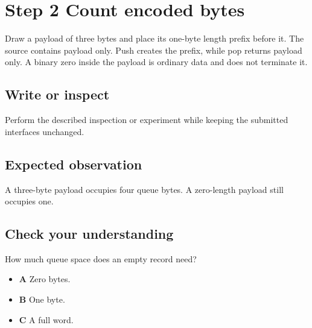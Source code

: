 \section{Step 2 Count encoded bytes}\label{ring-s02}

Draw a payload of three bytes and place its one-byte length prefix before it. The source contains payload only. Push creates the prefix, while pop returns payload only. A binary zero inside the payload is ordinary data and does not terminate it.

\subsection{Write or inspect}
Perform the described inspection or experiment while keeping the submitted interfaces unchanged.

\subsection{Expected observation}
A three-byte payload occupies four queue bytes. A zero-length payload still occupies one.

\subsection{Check your understanding}
How much queue space does an empty record need?

\begin{itemize}
  \item \textbf{A} Zero bytes.
  \item \textbf{B} One byte.
  \item \textbf{C} A full word.
\end{itemize}
